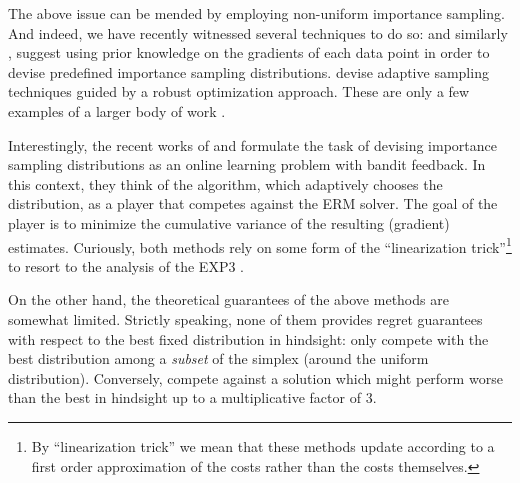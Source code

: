 The above issue can be mended by employing non-uniform importance sampling.
And indeed, we have recently witnessed several  techniques to do so: %
\citet{zhao2015stochastic} and similarly \citet{needell2014stochastic}, suggest using prior knowledge on the gradients of each data point in order to devise predefined importance sampling distributions.  \citet{NIPS2017_7025} devise adaptive sampling techniques guided by a robust optimization approach. These are only a few examples of a larger body of work 
 \citep{bouchard2015online, alain2015variance, csiba2016importance}.

Interestingly, the recent works of \cite{pmlr-v70-namkoong17a} and \cite{salehi2017} formulate the task of devising importance sampling distributions as an online learning problem with bandit feedback. In this context, they  think of the algorithm, which adaptively chooses the distribution, as a player that competes against the ERM solver. The goal of the player is to minimize the cumulative variance of the resulting (gradient) estimates.  Curiously, both methods rely on some form of the ``linearization trick''\footnote{ By ``linearization trick'' we mean that these methods update according to a first order approximation  of the costs rather than the costs themselves.} 
 to resort to the analysis of the EXP3  \citep{auer2002nonstochastic}.

On the other hand, the theoretical guarantees of the above methods are somewhat limited. Strictly speaking, none of them provides regret guarantees with respect to the best fixed distribution in hindsight:  \citet{pmlr-v70-namkoong17a} only compete with the best distribution among a \emph{subset} of the simplex (around the uniform distribution).  Conversely, \cite{salehi2017} compete against a solution which might perform worse than the best in hindsight up to a multiplicative factor of $3$.

